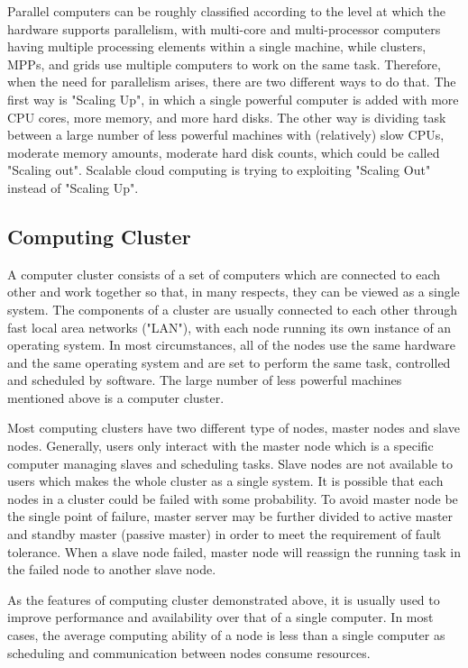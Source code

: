 Parallel computers can be roughly classified according to the level at which the hardware supports parallelism, with multi-core and multi-processor computers having multiple processing elements within a single machine, while clusters, MPPs, and grids use multiple computers to work on the same task. Therefore, when the need for parallelism arises, there are two different ways to do that. The first way is "Scaling Up", in which a single powerful computer is added with more CPU cores, more memory, and more hard disks. The other way is dividing task between a large number of less powerful machines with (relatively) slow CPUs, moderate memory amounts, moderate hard disk counts, which could be called "Scaling out". Scalable cloud computing is trying to exploiting "Scaling Out" instead of "Scaling Up".

\subsection{Computing Cluster}
A computer cluster consists of a set of computers which are connected to each other and work together so that, in many respects, they can be viewed as a single system. The components of a cluster are usually connected to each other through fast local area networks ("LAN"), with each node running its own instance of an operating system. In most circumstances, all of the nodes use the same hardware and the same operating system and are set to perform the same task, controlled and scheduled by software. The large number of less powerful machines mentioned above is a computer cluster.

Most computing clusters have two different type of nodes, master nodes and slave nodes. Generally,  users only interact with the master node which is a specific computer managing slaves and scheduling tasks. Slave nodes are not available to users which makes the whole cluster as a single system. It is possible that each nodes in a cluster could be failed with some probability. To avoid master node be the single point of failure, master server may be further divided to active master and standby master (passive master) in order to meet the requirement of fault tolerance. When a slave node failed, master node will reassign the running task in the failed node to another slave node. 

As the features of computing cluster demonstrated above, it is usually used to improve performance and availability over that of a single computer. In most cases, the average computing ability of a node is less than a single computer as scheduling and communication between nodes consume resources.

